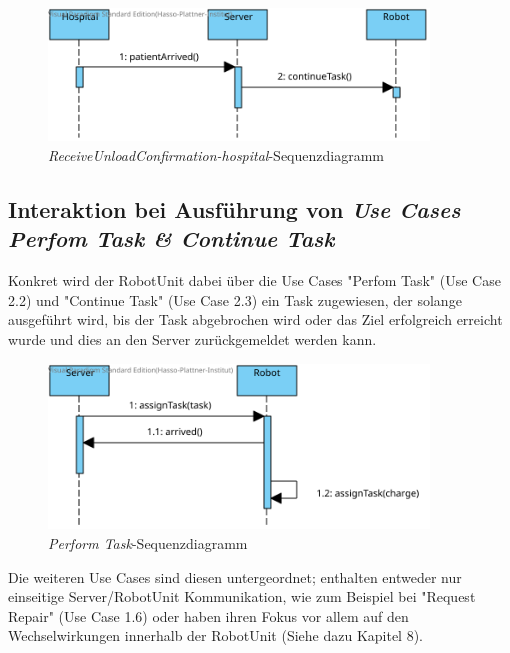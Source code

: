 \begin{figure}[H]
	\centering
	\includegraphics[width=0.9\textwidth]{img/2-Entwurf-ReceiveUnloadConfirmation-hospital}
	\caption{\emph{ReceiveUnloadConfirmation-hospital}-Sequenzdiagramm}
	\label{SequenzDiagrammInteraktion}
\end{figure}


\subsection*{Interaktion bei Ausführung von \emph{Use Cases Perfom Task \& Continue Task}}
Konkret wird der RobotUnit dabei über die Use Cases "Perfom Task" (Use Case 2.2) und "Continue Task" (Use Case 2.3) ein Task zugewiesen, der solange ausgeführt wird, bis der Task abgebrochen wird oder das Ziel erfolgreich erreicht wurde und dies an den Server zurückgemeldet werden kann. \\

\begin{figure}[H]
	\centering
	\includegraphics[width=0.9\textwidth]{img/2-Entwurf-PerformTask}
	\caption{\emph{Perform Task}-Sequenzdiagramm}
	\label{SequenzDiagrammInteraktion}
\end{figure}

Die weiteren Use Cases sind diesen untergeordnet; enthalten entweder nur einseitige Server/RobotUnit Kommunikation, wie zum Beispiel bei "Request Repair" (Use Case 1.6) oder haben ihren Fokus vor allem auf den Wechselwirkungen innerhalb der RobotUnit (Siehe dazu Kapitel 8). \\


